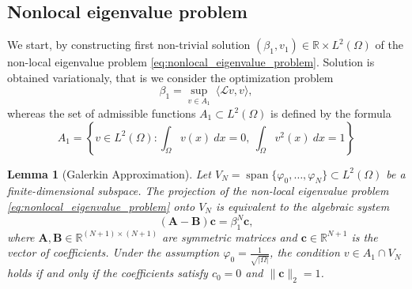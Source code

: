\documentclass[11pt, a4paper]{article}
\theoremstyle{break}
\theoremstyle{break}
\theoremstyle{break}
\theoremstyle{break}
\theoremstyle{break}
\newtheorem{lem}{Lemma}[section]
\theoremstyle{break}
\theoremstyle{break}
\theoremstyle{break}
\theoremstyle{break}
\theoremstyle{break}
\begin{document}
\subsection{Nonlocal eigenvalue problem}

We start, by constructing first non-trivial solution $(\beta_1, v_1) \in \mathbb{R} \times L^2(\Omega)$ of the non-local eigenvalue problem \eqref{eq:nonlocal_eigenvalue_problem}. Solution is obtained variationaly, that is we consider the optimization problem
\begin{equation}
    \label{eq:eigenvalue_problem_1}
    \beta_1 = \sup_{v \in A_1} \: \langle \mathcal L v, v \rangle,
\end{equation}
whereas the set of admissible functions $A_1 \subset L^2(\Omega)$ is defined by the formula
\begin{equation}
    \label{eq:A_set_Def}
    A_1 = \left\{ v \in L^2(\Omega) : \int_\Omega v(x) \:dx = 0, \: \int_\Omega v^2(x) \:dx = 1 \right\}
\end{equation}

\begin{lem}[Galerkin Approximation]
\label{lem:galerkin_approximation}
Let $V_N = \operatorname{span}\{\varphi_0, \dots, \varphi_N\} \subset L^2(\Omega)$ be a finite-dimensional subspace. The projection of the non-local eigenvalue problem \eqref{eq:nonlocal_eigenvalue_problem} onto $V_N$ is equivalent to the algebraic system 
\begin{equation}
    \label{eq:matrix_system_lemma}
    (\mathbf{A} - \mathbf{B})\mathbf{c} = \beta_1^N \mathbf{c},
\end{equation}
where $\mathbf{A}, \mathbf{B} \in \mathbb{R}^{(N+1) \times (N+1)}$ are symmetric matrices and $\mathbf{c} \in \mathbb{R}^{N+1}$ is the vector of coefficients. Under the assumption $\varphi_0 = \frac{1}{\sqrt{|\Omega|}}$, the condition $v \in A_1 \cap V_N$ holds if and only if the coefficients satisfy $c_0 = 0$ and $\|\mathbf{c}\|_2 = 1$.
\end{lem}
\end{document}
